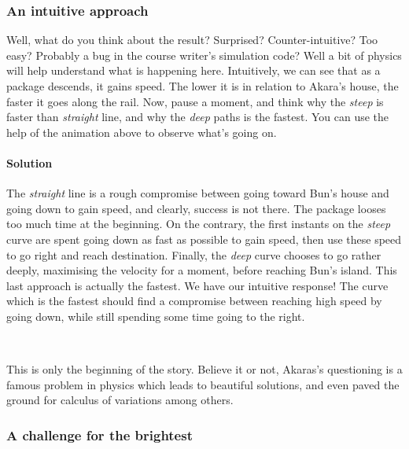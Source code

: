 \documentclass{article}
\begin{document}
\subsubsection*{An intuitive approach}

Well, what do you think about the result? Surprised? Counter-intuitive? Too easy? Probably a bug in the course writer's simulation code? Well a bit of physics will help understand what is happening here. Intuitively, we can see that as a package descends, it gains speed. The lower it is in relation to Akara's house, the faster it goes along the rail. Now, pause a moment, and think why the \textit{steep} is faster than \textit{straight} line, and why the \textit{deep} paths is the fastest. You can use the help of the animation above to observe what's going on.\\

\begin{tcolorbox}

\paragraph{Solution}

The \textit{straight} line is a rough compromise between going toward Bun's house and going down to gain speed, and clearly, success is not there. The package looses too much time at the beginning. On the contrary, the first instants on the \textit{steep} curve are spent going down as fast as possible to gain speed, then use these speed to go right and reach destination. Finally, the \textit{deep} curve chooses to go rather deeply, maximising the velocity for a moment, before reaching Bun's island. This last approach is actually the fastest. We have our intuitive response! The curve which is the fastest should find a compromise between reaching high speed by going down, while still spending some time going to the right.

\end{tcolorbox}
~

This is only the beginning of the story. Believe it or not, Akaras's questioning is a famous problem in physics which leads to beautiful solutions, and even paved the ground for calculus of variations among others.

\subsubsection*{A challenge for the brightest}
\end{document}
